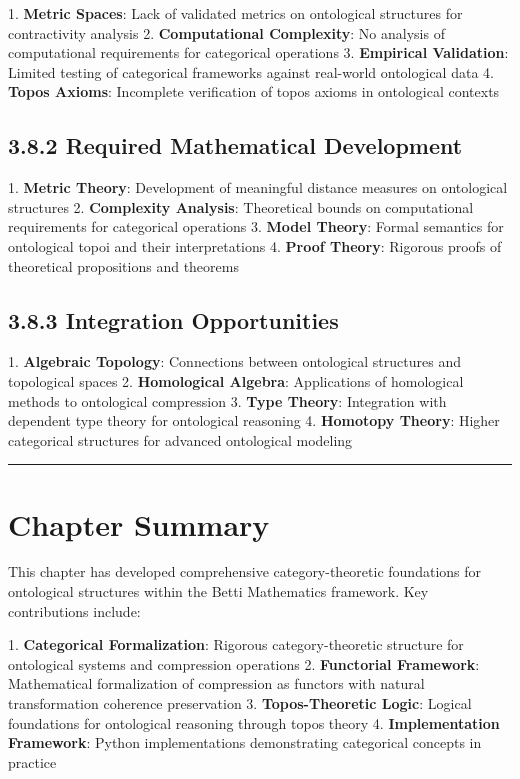 1. \textbf{Metric Spaces}: Lack of validated metrics on ontological structures for contractivity analysis
2. \textbf{Computational Complexity}: No analysis of computational requirements for categorical operations
3. \textbf{Empirical Validation}: Limited testing of categorical frameworks against real-world ontological data
4. \textbf{Topos Axioms}: Incomplete verification of topos axioms in ontological contexts

\subsection{3.8.2 Required Mathematical Development}

1. \textbf{Metric Theory}: Development of meaningful distance measures on ontological structures
2. \textbf{Complexity Analysis}: Theoretical bounds on computational requirements for categorical operations
3. \textbf{Model Theory}: Formal semantics for ontological topoi and their interpretations
4. \textbf{Proof Theory}: Rigorous proofs of theoretical propositions and theorems

\subsection{3.8.3 Integration Opportunities}

1. \textbf{Algebraic Topology}: Connections between ontological structures and topological spaces
2. \textbf{Homological Algebra}: Applications of homological methods to ontological compression
3. \textbf{Type Theory}: Integration with dependent type theory for ontological reasoning
4. \textbf{Homotopy Theory}: Higher categorical structures for advanced ontological modeling

\hrule

\section{Chapter Summary}

This chapter has developed comprehensive category-theoretic foundations for ontological structures within the Betti Mathematics framework. Key contributions include:

1. \textbf{Categorical Formalization}: Rigorous category-theoretic structure for ontological systems and compression operations
2. \textbf{Functorial Framework}: Mathematical formalization of compression as functors with natural transformation coherence preservation
3. \textbf{Topos-Theoretic Logic}: Logical foundations for ontological reasoning through topos theory
4. \textbf{Implementation Framework}: Python implementations demonstrating categorical concepts in practice

